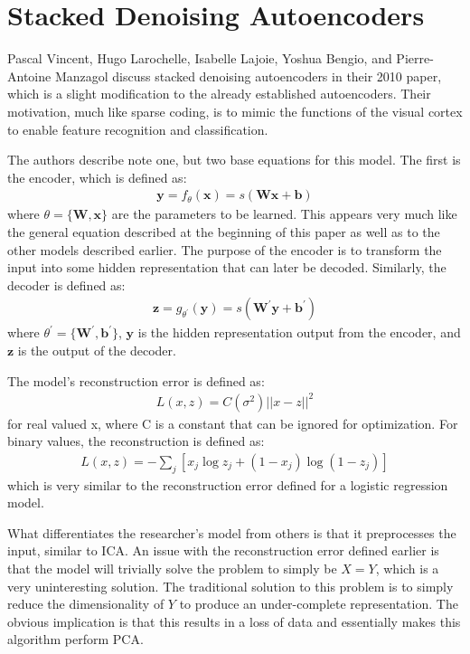 \documentclass{article}
\newcommand{\vect}[1]{\mathbf{#1}}
\newcommand{\matr}[1]{\mathbf{#1}}
\newcommand{\vb}[0]{\vect{b}}
\newcommand{\vx}[0]{\vect{x}}
\newcommand{\vz}[0]{\vect{z}}
\newcommand{\vy}[0]{\vect{y}}
\newcommand{\mW}[0]{\matr{W}}
\newcommand{\sigmoid}{\sigma}
\begin{document}
\section {Stacked Denoising Autoencoders}

Pascal Vincent, Hugo Larochelle, Isabelle Lajoie, Yoshua Bengio, and Pierre-Antoine Manzagol discuss stacked denoising autoencoders in their 2010 paper, which is a slight modification to the already established autoencoders. Their motivation, much like sparse coding, is to mimic the functions of the visual cortex to enable feature recognition and classification. 

The authors describe note one, but two base equations for this model. The first is the encoder, which is defined as:
\begin{align*}
\vy = f_\theta (\vx) = s(\mW \vx + \vb)
\end{align*}
where $\theta = \{ \mW, \vx \}$ are the parameters to be learned. This appears very much like the general equation described at the beginning of this paper as well as to the other models described earlier. The purpose of the encoder is to transform the input into some hidden representation that can later be decoded. Similarly, the decoder is defined as:
\begin{align*}
\vz = g_{\theta^{'}} (\vy) = s(\mW^{'}  \vy + \vb^{'})
\end{align*}
where $\theta^{'} = \{ \mW^{'}, \vb^{'} \}$, $\vy$ is the hidden representation output from the encoder, and $\vz$ is the output of the decoder. 

The model's reconstruction error is defined as:
\begin{align*}
L(x, z) = C(\sigmoid^2) ||x-z||^2
\end{align*}
for real valued x, where C is a constant that can be ignored for optimization. For binary values, the reconstruction is defined as:
\begin{align*}
L(x, z) = - \sum_j [x_j \log z_j + (1 - x_j) \log (1-z_j)]
\end{align*}
which is very similar to the reconstruction error defined for a logistic regression model.

What differentiates the researcher's model from others is that it preprocesses the input, similar to ICA. An issue with the reconstruction error defined earlier is that the model will trivially solve the problem to simply be $X = Y$, which is a very uninteresting solution. The traditional solution to this problem is to simply reduce the dimensionality of $Y$ to produce an under-complete representation. The obvious implication is that this results in a loss of data and essentially makes this algorithm perform PCA.
\end{document}
